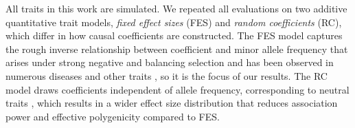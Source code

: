 \documentclass[9pt,lineno]{elife}
\begin{document}
All traits in this work are simulated.
We repeated all evaluations on two additive quantitative trait models, \textit{fixed effect sizes} (FES) and \textit{random coefficients} (RC), which differ in how causal coefficients are constructed.
The FES model captures the rough inverse relationship between coefficient and minor allele frequency that arises under strong negative and balancing selection and has been observed in numerous diseases and other traits \citep{park_distribution_2011, zeng_signatures_2018, simons_population_2018, oconnor_extreme_2019}, so it is the focus of our results.
The RC model draws coefficients independent of allele frequency, corresponding to neutral traits \citep{zeng_signatures_2018, simons_population_2018}, which results in a wider effect size distribution that reduces association power and effective polygenicity compared to FES.
\end{document}
